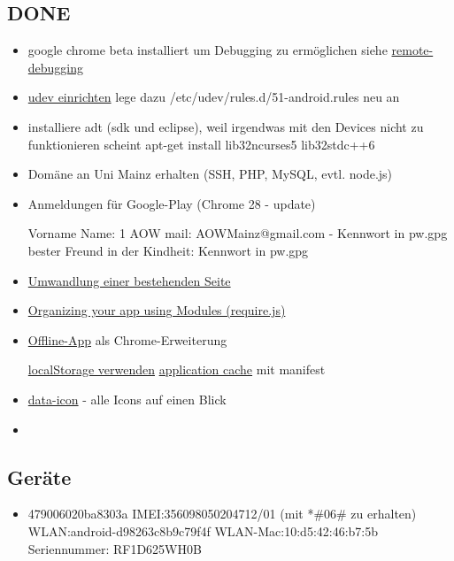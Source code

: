 \documentclass[a4paper]{scrartcl}
\begin{document}
		\subsection{DONE}
			\begin{itemize}
				\item google chrome beta installiert um Debugging zu ermöglichen siehe \href{https://developers.google.com/chrome-developer-tools/docs/remote-debugging}{remote-debugging}
				\item \href{http://developer.android.com/tools/device.html#setting-up}{udev einrichten} lege dazu /etc/udev/rules.d/51-android.rules neu an
				\item installiere adt (sdk und eclipse), weil irgendwas mit den Devices nicht zu funktionieren scheint \newline apt-get install lib32ncurses5 lib32stdc++6
				\item Domäne an Uni Mainz erhalten (SSH, PHP, MySQL, evtl. node.js)
				\item Anmeldungen für Google-Play (Chrome 28 - update)

					Vorname Name: 1 AOW \newline
					mail: AOWMainz@gmail.com - Kennwort in pw.gpg \newline
					bester Freund in der Kindheit: Kennwort in pw.gpg
				\item \href{http://www.ofbrooklyn.com/2012/11/13/backbonification-migrating-javascript-to-backbone}{Umwandlung einer bestehenden Seite}
				\item \href{http://backbonetutorials.com/organizing-backbone-using-modules/}{Organizing your app using Modules (require.js)}
				\item \href{http://developer.chrome.com/apps/about_apps.html}{Offline-App} als Chrome-Erweiterung
					
					\href{http://docs.webplatform.org/wiki/tutorials/offline_storage}{localStorage verwenden}\newline
					\href{http://docs.webplatform.org/wiki/tutorials/appcache_beginner}{application cache} mit manifest
				\item \href{http://jquerymobile.com/demos/1.3.0-rc.1/docs/lists/lists-themes.html}{data-icon} - alle Icons auf einen Blick
				\item 
			\end{itemize}
		\subsection{Geräte}
			\begin{itemize}
				\item 479006020ba8303a \newline
					IMEI:356098050204712/01 (mit *\#06\# zu erhalten) \newline
					WLAN:android-d98263c8b9c79f4f \newline
					WLAN-Mac:10:d5:42:46:b7:5b \newline
					Seriennummer: RF1D625WH0B

			\end{itemize}
\end{document}
